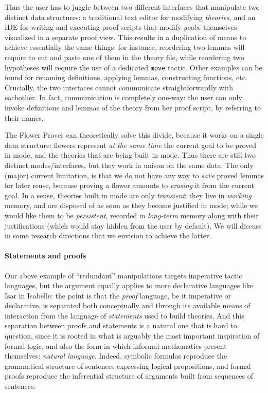Thus the user has to juggle between two different interfaces that manipulate two
distinct data structures: a traditional text editor for modifying
\emph{theories}, and an IDE for writing and executing proof scripts that modify
\emph{goals}, themselves visualized in a separate proof view. This results in a
duplication of means to achieve essentially the same things: for instance,
reordering two lemmas will require to cut and paste one of them in the theory
file, while reordering two hypotheses will require the use of a dedicated
\texttt{move} tactic. Other examples can be found for renaming definitions,
applying lemmas, constructing functions, etc. Crucially, the two interfaces
cannot communicate straightforwardly with eachother. In fact, communication is
completely one-way: the user can only invoke definitions and lemmas of the
theory from her proof script, by referring to their names.

The Flower Prover can theoretically solve this divide, because it works on a
single data structure: flowers represent \emph{at the same time} the current
goal to be proved in \Proof mode, and the theories that are being built in \Edit
mode. Thus there are still two distinct modes/interfaces, but they work in
unison on the same data. The only (major) current limitation, is that we do not
have any way to \emph{save} proved lemmas for later reuse, because proving a
flower amounts to \emph{erasing} it from the current goal. In a sense, theories
built in \Edit mode are only \emph{transient}: they live in \emph{working}
memory, and are disposed of as soon as they become justified in \Proof mode;
while we would like them to be \emph{persistent}, recorded in \emph{long-term}
memory along with their justifications (which would stay hidden from the user by
default). We will discuss in  some research directions that
we envision to achieve the latter. 

\paragraph{Statements and proofs}

Our above example of ``redundant'' manipulations targets imperative tactic
languages, but the argument equally applies to more declarative languages like
Isar in Isabelle: the point is that the \emph{proof} language, be it imperative
or declarative, is separated both conceptually and through its available means
of interaction from the language of \emph{statements} used to build theories.
And this separation between proofs and statements is a natural one that is hard
to question, since it is rooted in what is arguably the most important
inspiration of formal logic, and also the form in which informal mathematics
present themselves: \emph{natural language}. Indeed, symbolic formulas reproduce
the grammatical structure of sentences expressing logical propositions, and
formal proofs reproduce the inferential structure of arguments built from
sequences of sentences.


